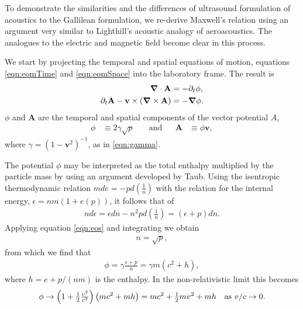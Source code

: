 \documentclass[10pt, fleqn,final,showtrims,oldfontcommands]{article} %
\newcommand{\sub}[1]{\begin{subequations}#1\end{subequations}}
\newcommand{\eqnref}[1]{\ref{eqn:#1}}
\newcommand{\lr}[1]{\left( #1 \right)}
\renewcommand{\d}{\partial}
\newcommand{\del}{\nabla}
\newcommand{\vdel}{ \mbox{\boldmath $\del$}}
\newcommand{\dt}{{\d_t}}
\newcommand{\g}{\gamma_0}
\newcommand{\vA}{\textbf{A}}
\newcommand{\vv}{\textbf{v}}
\begin{document}
To demonstrate the similarities and the differences of ultrasound formulation of acoustics  to the Gallilean formulation,
we re-derive Maxwell's relation using an argument very similar to Lighthill's acoustic analogy\cite{Lighthill1952} of aeroacoustics.
The analogues to the electric and magnetic field  become clear in this process.

We start  by projecting the temporal and spatial equations of motion, equations \eqnref{eomTime} and \eqnref{eomSpace}
into the laboratory frame.
The result is
\sub{
  \begin{align}
     \vdel \cdot \vA &=  - \dt \phi, \label{eqn:Rcontinuity}\\ %
\dt \vA - \vv \times  \lr{\vdel \times \vA} \label{eqn:REuler}
&= - \vdel \phi.
  \end{align}
}
$\phi$ and $\vA$ are the temporal and spatial components of the vector potential $A$,
\begin{align}
\phi &\equiv  2\gamma \sqrt {p}   %
& \quad\text{and} &&
\vA &\equiv  \phi \vv,  %
 \end{align}
where $\gamma = (1-\vv^2)^{-1}$, as in \eqnref{gamma}.

The potential $\phi$ may be  interpreted as the  total enthalpy multiplied by the particle mass by using an argument developed by Taub\cite{Taub1978}.
Using the isentropic thermodynamic relation $m de = - p d\lr{\frac{1}{n}}$ with the relation for the internal energy, $\epsilon= nm( 1 + e(p))$,
it follows that of
\begin{align}
 n d\epsilon = \epsilon dn - n^2 p d \lr{\frac{1}{n}} = \lr{\epsilon + p} dn.
\end{align}
Applying equation \eqnref{eos} and integrating we obtain
\begin{align}
  n = \sqrt p, \label{eqn:nrootp}
\end{align}
from which we find that 
\begin{align}
  \phi =   \gamma\frac{\epsilon + p }{n} = \gamma m\lr{c^2 + h},
\end{align}
where $h = e + p/(nm)$ is the enthalpy.
In the  non-relativistic limit this becomes
\begin{align}
  \phi \rightarrow \lr{1+\tfrac{1}{2}\tfrac{v^2}{c^2}} \lr{mc^2 + mh} = mc^2 + \tfrac{1}{2}m v^2 + mh \text{\quad as ${v/c\rightarrow 0.}$}
\end{align}
\end{document}
